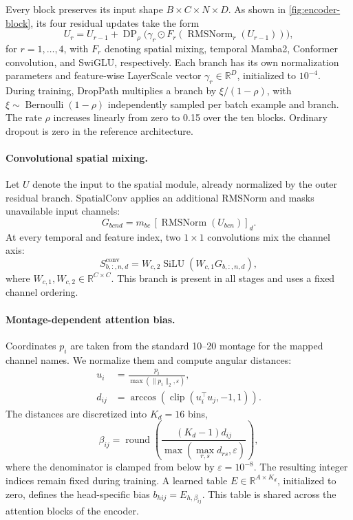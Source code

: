 \documentclass{article}
\DeclareMathOperator{\RN}{RMSNorm}
\DeclareMathOperator{\SiLU}{SiLU}
\begin{document}
Every block preserves its input shape $B\times C\times N\times D$.
As shown in \cref{fig:encoder-block}, its four residual updates take the form
\begin{equation}
    U_r=U_{r-1}+\operatorname{DP}_{\rho}
    \bigl(\gamma_r\odot F_r(\RN_r(U_{r-1}))\bigr),
    \label{eq:residual-block}
\end{equation}
for $r=1,\ldots,4$, with $F_r$ denoting spatial mixing, temporal Mamba2,
Conformer convolution, and SwiGLU, respectively. Each branch has its own
normalization parameters and feature-wise LayerScale vector
$\gamma_r\in\mathbb{R}^{D}$, initialized to $10^{-4}$.
During training, DropPath multiplies a branch by
$\xi/(1-\rho)$, with $\xi\sim\operatorname{Bernoulli}(1-\rho)$ independently
sampled per batch example and branch. The rate $\rho$ increases linearly
from zero to 0.15 over the ten blocks. Ordinary dropout is zero in the
reference architecture.

\paragraph{Convolutional spatial mixing.}
Let $U$ denote the input to the spatial module, already normalized by the
outer residual branch. SpatialConv applies an additional RMSNorm and masks
unavailable input channels:
\begin{equation}
    G_{bcnd}=m_{bc}\,[\RN(U_{bcn})]_d.
\end{equation}
At every temporal and feature index, two $1\times1$ convolutions mix the
channel axis:
\begin{equation}
    S^{\mathrm{conv}}_{b,:,n,d}
    =W_{c,2}\SiLU(W_{c,1}G_{b,:,n,d}),
    \label{eq:spatial-conv}
\end{equation}
where $W_{c,1},W_{c,2}\in\mathbb{R}^{C\times C}$.
This branch is present in all stages and uses a fixed channel ordering.

\paragraph{Montage-dependent attention bias.}
Coordinates $p_i$ are taken from the standard 10--20 montage for the mapped
channel names. We normalize them and compute angular distances:
\begin{align}
    u_i&=\frac{p_i}{\max(\|p_i\|_2,\varepsilon)},\\
    d_{ij}&=\arccos\!\left(\operatorname{clip}(u_i^\top u_j,-1,1)\right).
\end{align}
The distances are discretized into $K_d=16$ bins,
\begin{equation}
    \beta_{ij}=\operatorname{round}\!\left(
      \frac{(K_d-1)d_{ij}}{\max(\max_{r,s}d_{rs},\varepsilon)}
    \right),
    \label{eq:distance-bins}
\end{equation}
where the denominator is clamped from below by
$\varepsilon=10^{-8}$. The resulting integer indices remain fixed during training.
A learned table $E\in\mathbb{R}^{A\times K_d}$, initialized to zero,
defines the head-specific bias $b_{hij}=E_{h,\beta_{ij}}$.
This table is shared across the attention blocks of the encoder.
\end{document}
